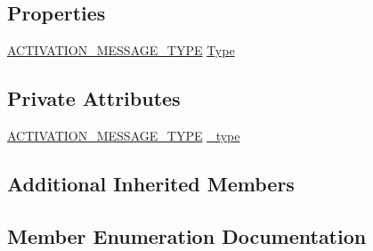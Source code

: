 \subsection*{Properties}
\begin{DoxyCompactItemize}
\item 
\hyperlink{class_web_analyzer_1_1_models_1_1_message_model_1_1_activation_message_ad3b5847039dd26527a842c6f7675b1b2}{A\+C\+T\+I\+V\+A\+T\+I\+O\+N\+\_\+\+M\+E\+S\+S\+A\+G\+E\+\_\+\+T\+Y\+P\+E} \hyperlink{class_web_analyzer_1_1_models_1_1_message_model_1_1_activation_message_a0f68201fb8faad6d3a2a074bc7670313}{Type}
\end{DoxyCompactItemize}
\subsection*{Private Attributes}
\begin{DoxyCompactItemize}
\item 
\hyperlink{class_web_analyzer_1_1_models_1_1_message_model_1_1_activation_message_ad3b5847039dd26527a842c6f7675b1b2}{A\+C\+T\+I\+V\+A\+T\+I\+O\+N\+\_\+\+M\+E\+S\+S\+A\+G\+E\+\_\+\+T\+Y\+P\+E} \hyperlink{class_web_analyzer_1_1_models_1_1_message_model_1_1_activation_message_a108e256eff9daab288b9c8c8f18d9792}{\+\_\+type}
\end{DoxyCompactItemize}
\subsection*{Additional Inherited Members}


\subsection{Member Enumeration Documentation}
\hypertarget{class_web_analyzer_1_1_models_1_1_message_model_1_1_activation_message_ad3b5847039dd26527a842c6f7675b1b2}{}

